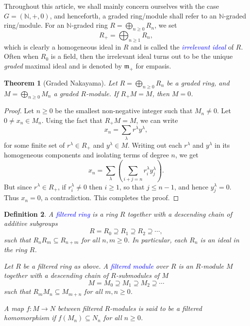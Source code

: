 \documentclass[11pt]{article}
\theoremstyle{thmstyle}
\newtheorem{theorem}{Theorem}[section]
\theoremstyle{defstyle}
\newtheorem{definition}[theorem]{Definition}
\newcommand{\N}{\mathbb{N}}
\newcommand{\frakm}{\mathfrak{m}} %
\newcommand{\define}[1]{\textcolor{blue}{\textit{#1}}}
\renewcommand{\le}{\leqslant}
\renewcommand{\ge}{\geqslant}
\begin{document}
Throughout this article, we shall mainly concern ourselves with the case $G = (\N, +, 0)$, and henceforth, a graded ring/module shall refer to an $\N$-graded ring/module. For an $\N$-graded ring $\displaystyle R = \bigoplus_{n\ge 0} R_n$, we set 
\begin{equation*}
    R_+ = \bigoplus_{n\ge 1} R_n,
\end{equation*}
which is clearly a homogeneous ideal in $R$ and is called the \define{irrelevant ideal} of $R$. Often when $R_0$ is a field, then the irrelevant ideal turns out to be the unique \emph{graded} maximal ideal and is denoted by $\frakm_+$ for empasis.

\begin{theorem}[Graded Nakayama]
    Let $\displaystyle R = \bigoplus_{n\ge 0} R_n$ be a graded ring, and $\displaystyle M = \bigoplus_{n\ge 0} M_n$ a graded $R$-module. If $R_+ M = M$, then $M = 0$.
\end{theorem}
\begin{proof}
    Let $n\ge 0$ be the smallest non-negative integer such that $M_n\ne 0$. Let $0\ne x_n\in M_n$. Using the fact that $R_+ M = M$, we can write 
    \begin{equation*}
        x_n = \sum_\lambda r^\lambda y^\lambda,
    \end{equation*}
    for some finite set of $r^\lambda\in R_+$ and $y^\lambda\in M$. Writing out each $r^\lambda$ and $y^\lambda$ in its homogeneous components and isolating terms of degree $n$, we get 
    \begin{equation*}
        x_n = \sum_{\lambda}\left(\sum_{i + j = n} r^\lambda_i y^\lambda_j\right).
    \end{equation*}
    But since $r^\lambda\in R_+$, if $r^\lambda_i\ne 0$ then $i\ge 1$, so that $j\le n - 1$, and hence $y^\lambda_j = 0$. Thus $x_n = 0$, a contradiction. This completes the proof.
\end{proof}

\begin{definition}
    A \define{filtered ring} is a ring $R$ together with a descending chain of additive subgroups 
    \begin{equation*}
        R = R_0\supseteq R_1\supseteq R_2\supseteq\cdots,
    \end{equation*}
    such that $R_nR_m\subseteq R_{n + m}$ for all $n, m\ge 0$. In particular, each $R_n$ is an ideal in the ring $R$.

    Let $R$ be a filtered ring as above. A \define{filtered module} over $R$ is an $R$-module $M$ together with a descending chain of $R$-submodules of $M$ 
    \begin{equation*}
        M = M_0\supseteq M_1\supseteq M_2\supseteq\cdots
    \end{equation*}
    such that $R_m M_n\subseteq M_{m + n}$ for all $m,n\ge 0$.

    A map $f\colon M\to N$ between filtered $R$-modules is said to be a filtered homomorphism if $f(M_n)\subseteq N_n$ for all $n\ge 0$.
\end{definition}
\end{document}
